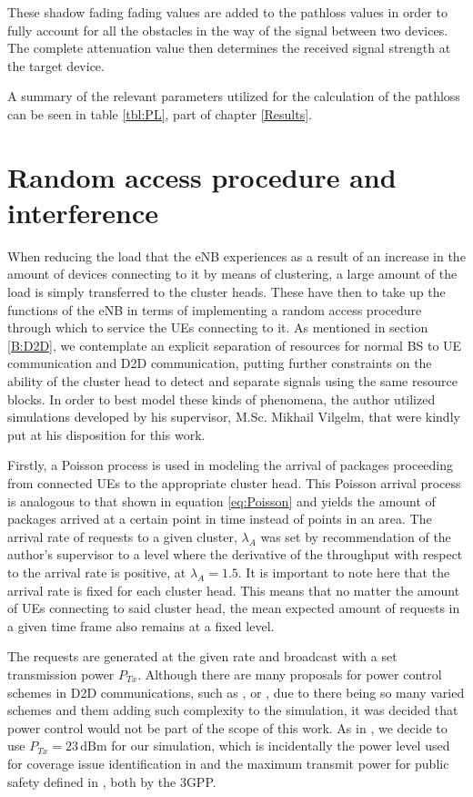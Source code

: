 These shadow fading fading values are added to the pathloss values in order to fully account for all the obstacles in the way of the signal between two devices. The complete attenuation value then determines the received signal strength at the target device.

A summary of the relevant parameters utilized for the calculation of the pathloss can be seen in table \ref{tbl:PL}, part of chapter \ref{Results}.


\section{Random access procedure and interference} \label{RAP}
When reducing the load that the eNB experiences as a result of an increase in the amount of devices connecting to it by means of clustering, a large amount of the load is simply transferred to the cluster heads. These have then to take up the functions of the eNB in terms of implementing a random access procedure through which to service the UEs connecting to it. As mentioned in section \ref{B:D2D}, we contemplate an explicit separation of resources for normal BS to UE communication and D2D communication, putting further constraints on the ability of the cluster head to detect and separate signals using the same resource blocks. In order to best model these kinds of phenomena, the author utilized simulations developed by his supervisor, M.Sc. Mikhail Vilgelm, that were kindly put at his disposition for this work.

Firstly, a Poisson process is used in modeling the arrival of packages proceeding from connected UEs to the appropriate cluster head. This Poisson arrival process is analogous to that shown in equation \ref{eq:Poisson} and yields the amount of packages arrived at a certain point in time instead of points in an area. The arrival rate of requests to a given cluster, $\lambda_A$ was set by recommendation of the author's supervisor to a level where the derivative of the throughput with respect to the arrival rate is positive, at $\lambda_A = 1.5$. It is important to note here that the arrival rate is fixed for each cluster head. This means that no matter the amount of UEs connecting to said cluster head, the mean expected amount of requests in a given time frame also remains at a fixed level.

The requests are generated at the given rate and broadcast with a set transmission power $P_{Tx}$. Although there are many proposals for power control schemes in D2D communications, such as \cite{Erturk2013}, \cite{Wei2012} or \cite{Lee}, due to there being so many varied schemes and them adding such complexity to the simulation, it was decided that power control would not be part of the scope of this work. As in \cite{Klugel2014a}, we decide to use $P_{Tx} = 23\,\text{dBm}$ for our simulation, which is incidentally the power level used for coverage issue identification in \cite{3rdGenerationPartnershipProject;2012} and the maximum transmit power for public safety defined in \cite{3rdGenerationPartnershipProject;}, both by the 3GPP.

